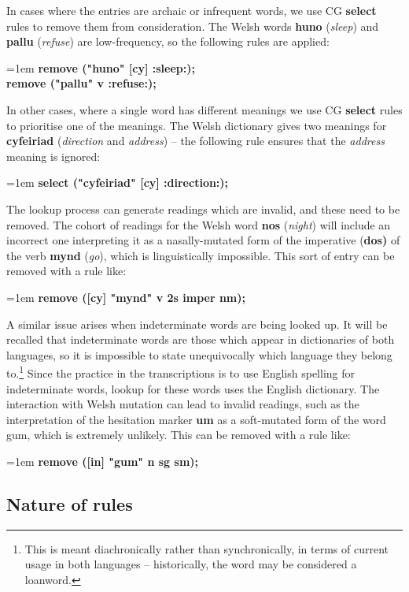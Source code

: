 \documentclass[11pt]{article}
\begin{document}
In cases where the entries are archaic or infrequent words, we use CG \textbf{select} rules to remove them from consideration.  The Welsh words \textbf{huno} (\textit{sleep}) and \textbf{pallu} (\textit{refuse}) are low-frequency, so the following rules are applied:

\noindent
\hangindent=1em
\textbf{remove ("huno" [cy] :sleep:);} \\
\textbf{remove ("pallu" v :refuse:);}

In other cases, where a single word has different meanings we use CG \textbf{select} rules to prioritise one of the meanings.  The Welsh dictionary gives two meanings for \textbf{cyfeiriad} (\textit{direction} and \textit{address}) -- the following rule ensures that the \textit{address} meaning is ignored:

\noindent
\hangindent=1em
\textbf{select ("cyfeiriad" [cy] :direction:);}

The lookup process can generate readings which are invalid, and these need to be removed.  The cohort of readings for the Welsh word \textbf{nos} (\textit{night}) will include an incorrect one interpreting it as a nasally-mutated form of the imperative (\textbf{dos)} of the verb \textbf{mynd} (\textit{go}), which is linguistically impossible.  This sort of entry can be removed with a rule like:

\noindent
\hangindent=1em
\textbf{remove ([cy] "mynd" v 2s imper nm);}

A similar issue arises when indeterminate words are being looked up.  It will be recalled that indeterminate words are those which appear in dictionaries of both languages, so it is impossible to state unequivocally which language they belong to.\footnote{This is meant diachronically rather than synchronically, in terms of current usage in both languages -- historically, the word may be considered a loanword.}  Since the practice in the transcriptions is to use English spelling for indeterminate words, lookup for these words uses the English dictionary.  The interaction with Welsh mutation can lead to invalid readings, such as the interpretation of the hesitation marker \textbf{um} as a soft-mutated form of the word gum, which is extremely unlikely.  This can be removed with a rule like:

\noindent
\hangindent=1em
\textbf{remove ([in] "gum" n sg sm);}


\subsection{Nature of rules}
\label{sec:nature}
\end{document}
